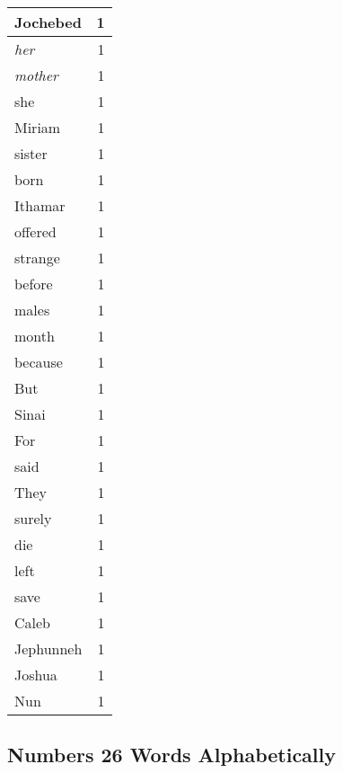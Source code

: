 \begin{center}
\begin{longtable}{l|r}
Jochebed & 1\\ \hline 
\emph{her} & 1\\ \hline 
\emph{mother} & 1\\ \hline 
she & 1\\ \hline 
Miriam & 1\\ \hline 
sister & 1\\ \hline 
born & 1\\ \hline 
Ithamar & 1\\ \hline 
offered & 1\\ \hline 
strange & 1\\ \hline 
before & 1\\ \hline 
males & 1\\ \hline 
month & 1\\ \hline 
because & 1\\ \hline 
But & 1\\ \hline 
Sinai & 1\\ \hline 
For & 1\\ \hline 
said & 1\\ \hline 
They & 1\\ \hline 
surely & 1\\ \hline 
die & 1\\ \hline 
left & 1\\ \hline 
save & 1\\ \hline 
Caleb & 1\\ \hline 
Jephunneh & 1\\ \hline 
Joshua & 1\\ \hline 
Nun & 1\\ \hline 
\end{longtable}
\end{center}





\subsection{Numbers 26 Words Alphabetically}


\normalsize
 
